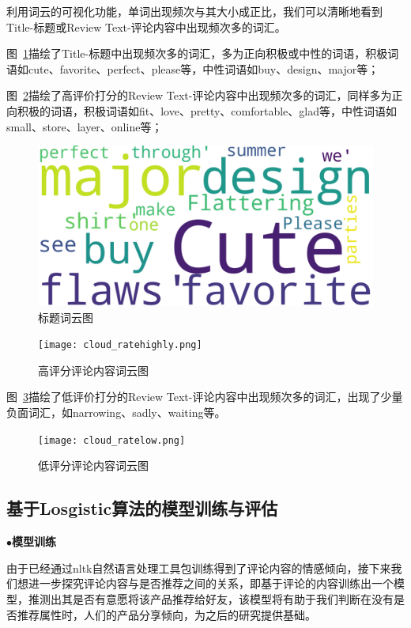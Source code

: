 \documentclass[
  journal=medium,
  manuscript=article-type,
  year=2023,
  volume=37,
]{cup-journal}
\begin{document}
利用词云的可视化功能，单词出现频次与其大小成正比，我们可以清晰地看到Title-标题或Review Text-评论内容中出现频次多的词汇。

​图~\ref{cloud_title}描绘了Title-标题中出现频次多的词汇，多为正向积极或中性的词语，积极词语如cute、favorite、perfect、please等，中性词语如buy、design、major等；~

图~\ref{cloud_ratehighly}描绘了高评价打分的Review Text-评论内容中出现频次多的词汇，同样多为正向积极的词语，积极词语如fit、love、pretty、comfortable、glad等，中性词语如small、store、layer、online等；

\begin{figure}[hbt!]
    \centering
    \includegraphics[width=0.7\linewidth]{cloud_title.png}
    \caption{标题词云图}
    \label{cloud_title}
\end{figure}

\begin{figure}[hbt!]
    \centering
    \texttt{[image: cloud\_ratehighly.png]}
    \caption{高评分评论内容词云图}
    \label{cloud_ratehighly}
\end{figure}

​图~\ref{cloud_ratelow}描绘了低评价打分的Review Text-评论内容中出现频次多的词汇，出现了少量负面词汇，如narrowing、sadly、waiting等。

\begin{figure}[hbt!]
    \centering
    \texttt{[image: cloud\_ratelow.png]}
    \caption{低评分评论内容词云图}
    \label{cloud_ratelow}
\end{figure}

\subsection{基于Losgistic算法的模型训练与评估}

\noindent$\bullet$\textbf{模型训练}

由于已经通过nltk自然语言处理工具包训练得到了评论内容的情感倾向，接下来我们想进一步探究评论内容与是否推荐之间的关系，即基于评论的内容训练出一个模型，推测出其是否有意愿将该产品推荐给好友，该模型将有助于我们判断在没有是否推荐属性时，人们的产品分享倾向，为之后的研究提供基础。
\end{document}
